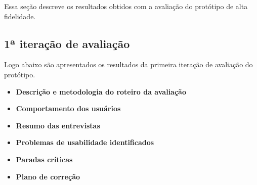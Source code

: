     Essa seção descreve os resultados obtidos com a avaliação do protótipo de alta fidelidade.
    
    \subsection{1ª iteração de avaliação}
    
      Logo abaixo são apresentados os resultados da primeira iteração de avaliação do protótipo.
      
      \begin{itemize}
       \item \textbf{Descrição e metodologia do roteiro da avaliação}
       
       \item \textbf{Comportamento dos usuários}
       
       \item \textbf{Resumo das entrevistas}
       
       \item \textbf{Problemas de usabilidade identificados}
       
       \item \textbf{Paradas críticas}
       
       \item \textbf{Plano de correção}
      \end{itemize}
